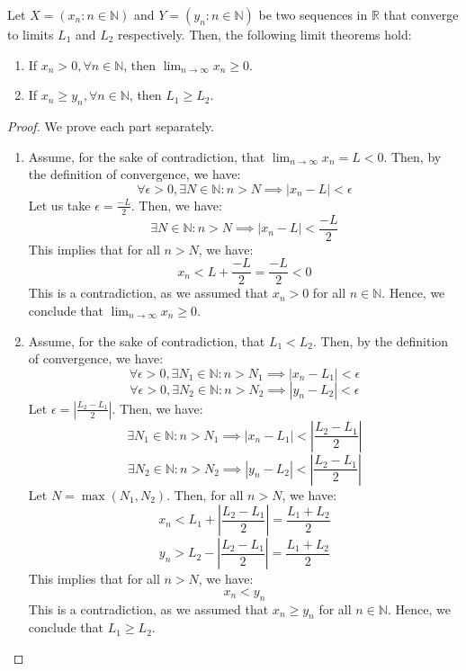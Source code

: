 \documentclass[openany]{book}
\numberwithin{equation}{section}
\begin{document}
    Let $X = (x_n : n \in \mathbb{N})$ and $Y = (y_n : n \in \mathbb{N})$ be two sequences in $\mathbb{R}$ that converge to limits $L_1$ and $L_2$ respectively. Then, the following limit theorems hold:
    \begin{enumerate}
        \item If $x_n > 0, \forall n \in \mathbb{N}$, then $\lim_{n \to \infty} x_n \geq 0$.
        \item If $x_n \geq y_n, \forall n \in \mathbb{N}$, then $L_1 \geq L_2$.
    \end{enumerate}
\par
\begin{proof}
    We prove each part separately. \\
    \begin{enumerate}
        \item Assume, for the sake of contradiction, that $\lim_{n \to \infty} x_n = L < 0$. Then, by the definition of convergence, we have:
        $$\forall \epsilon > 0, \exists N \in \mathbb{N}: n > N \implies |x_n - L| < \epsilon$$
        Let us take $\epsilon = \frac{-L}{2}$. Then, we have:
        $$\exists N \in \mathbb{N}: n > N \implies |x_n - L| < \frac{-L}{2}$$
        This implies that for all $n > N$, we have:
        $$x_n < L + \frac{-L}{2} = \frac{-L}{2} < 0$$
        This is a contradiction, as we assumed that $x_n > 0$ for all $n \in \mathbb{N}$. Hence, we conclude that $\lim_{n \to \infty} x_n \geq 0$.
        \item Assume, for the sake of contradiction, that $L_1 < L_2$. Then, by the definition of convergence, we have:
        $$\forall \epsilon > 0, \exists N_1 \in \mathbb{N}: n > N_1 \implies |x_n - L_1| < \epsilon$$
        $$\forall \epsilon > 0, \exists N_2 \in \mathbb{N}: n > N_2 \implies |y_n - L_2| < \epsilon$$
        Let $\epsilon = \left|\frac{L_2 - L_1}{2}\right|$. Then, we have:
        $$\exists N_1 \in \mathbb{N}: n > N_1 \implies |x_n - L_1| < \left|\frac{L_2 - L_1}{2}\right|$$
        $$\exists N_2 \in \mathbb{N}: n > N_2 \implies |y_n - L_2| < \left|\frac{L_2 - L_1}{2}\right|$$
        Let $N = \max(N_1, N_2)$. Then, for all $n > N$, we have:
        $$x_n < L_1 + \left|\frac{L_2 - L_1}{2}\right| = \frac{L_1 + L_2}{2}$$
        $$y_n > L_2 - \left|\frac{L_2 - L_1}{2}\right| = \frac{L_1 + L_2}{2}$$
        This implies that for all $n > N$, we have:
        $$x_n < y_n$$
        This is a contradiction, as we assumed that $x_n \geq y_n$ for all $n \in \mathbb{N}$. Hence, we conclude that $L_1 \geq L_2$.
    \end{enumerate}
\end{proof}
\end{document}
